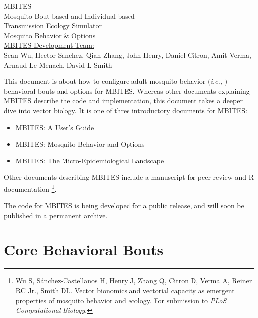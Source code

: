 \documentclass{article}
\newcommand{\ie}{{\em i.e., }}
\begin{document}


\begin{centering}
\Huge{MBITES}\\
\large{Mosquito Bout-based and Individual-based \\ Transmission Ecology Simulator}\\
\vspace{0.2in}
\huge{Mosquito Behavior \& Options}\\
\vspace{0.3in}
\large{\underline {MBITES Development Team:} \\ Sean Wu, Hector Sanchez, Qian Zhang, John Henry, Daniel Citron, Amit Verma, Arnaud Le Menach, David L Smith\\}

\end{centering}

\vspace{0.3in}


This document is about how to configure adult mosquito behavior (\ie) behavioral bouts and options for MBITES. Whereas other documents explaining MBITES describe the code and implementation, this document takes a deeper dive into vector biology. It is one of three introductory documents for MBITES: 
\begin{itemize}
\item MBITES: A User's Guide 
\item MBITES: Mosquito Behavior and Options
\item MBITES: The Micro-Epidemiological Landscape
\end{itemize}
Other documents describing MBITES include a manuscript for peer review and R documentation \footnote{Wu S, S{\' a}nchez-Castellanos H, Henry J, Zhang Q, Citron D, Verma A, Reiner RC Jr., Smith DL. Vector bionomics and vectorial capacity as emergent properties of mosquito behavior and ecology. For submission to {\em PLoS Computational Biology}.}. 

The code for MBITES is being developed for a public release, and will soon be published in a permanent archive.

\clearpage 


\section{Core Behavioral Bouts}
\end{document}
